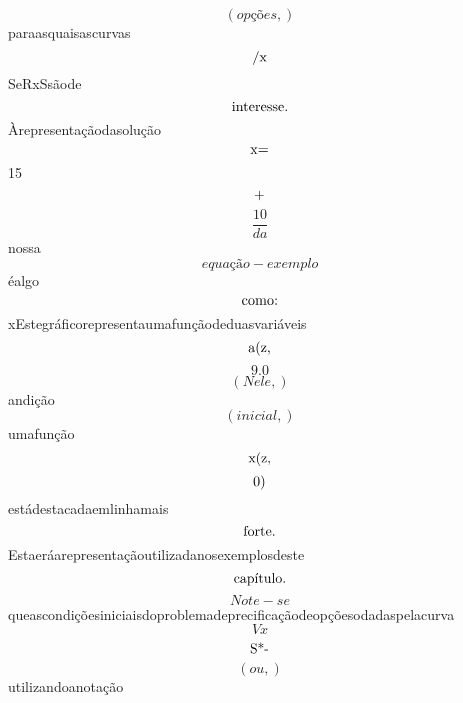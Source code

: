 \documentclass{article}
\begin{document}
\begin{equation}
\left( opções,\right)
\end{equation}paraasquaisascurvas\begin{equation}
$/x$
\end{equation}SeRxSsãode\begin{equation}
$interesse.$
\end{equation}Àrepresentaçãodasolução\begin{equation}
$x=$
\end{equation}15\begin{equation}
$+$
\end{equation}\begin{equation}
\frac{10}{da}
\end{equation}nossa\begin{equation}
equação - exemplo
\end{equation}éalgo\begin{equation}
$como:$
\end{equation}xEstegráficorepresentaumafunçãodeduasvariáveis\begin{equation}
$a(z,$
\end{equation}\begin{equation}
9.0
\end{equation}\begin{equation}
\left( Nele,\right)
\end{equation}andição\begin{equation}
\left( inicial,\right)
\end{equation}umafunção\begin{equation}
$x(z,$
\end{equation}\begin{equation}
$0)$
\end{equation}estádestacadaemlinhamais\begin{equation}
$forte.$
\end{equation}Estaeráarepresentaçãoutilizadanosexemplosdeste\begin{equation}
$capítulo.$
\end{equation}\begin{equation}
Note - se
\end{equation}queascondiçõesiniciaisdoproblemadeprecificaçãodeopçõesodadaspelacurva\begin{equation}
V x
\end{equation}\begin{equation}
$S*-$
\end{equation}\begin{equation}
\left( ou,\right)
\end{equation}utilizandoanotação\begin{equation}

\end{equation}
\end{document}
